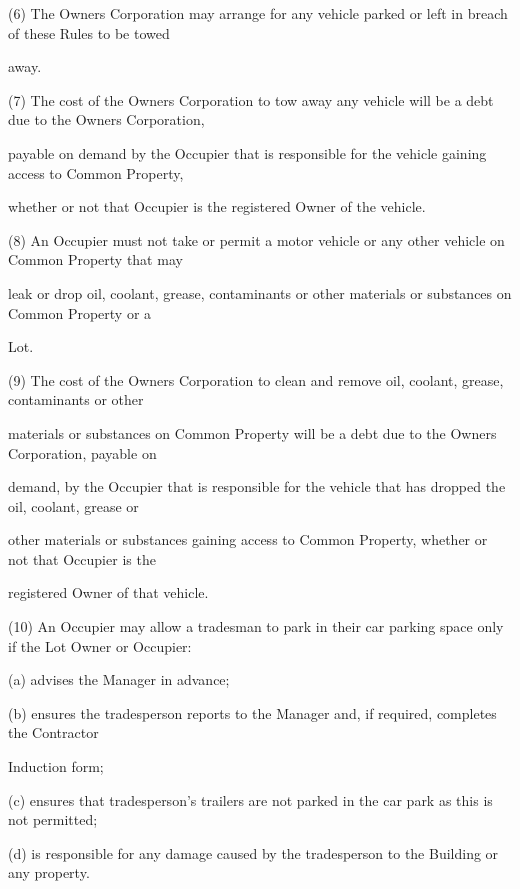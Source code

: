 \documentclass{article}
\begin{document}
{\fontsize{9.962}{1}(6) The Owners Corporation may arrange for any vehicle parked or left in breach of these Rules to be towed }

{\fontsize{10.02}{1}away. }

\newpage

{\fontsize{9.962}{1}(7) The cost of the Owners Corporation to tow away any vehicle will be a debt due to the Owners Corporation, }

{\fontsize{10.02}{1}payable on demand by the Occupier that is responsible for the vehicle gaining access to Common Property, }

{\fontsize{10.02}{1}whether or not that Occupier is the registered Owner of the vehicle. }

{\fontsize{9.962}{1}(8) An Occupier must not take or permit a motor vehicle or any other vehicle on Common Property that may }

{\fontsize{10.02}{1}leak or drop oil, coolant, grease, contaminants or other materials or substances on Common Property or a }

{\fontsize{10.02}{1}Lot. }

{\fontsize{9.962}{1}(9) The cost of the Owners Corporation to clean and remove oil, coolant, grease, contaminants or other }

{\fontsize{10.02}{1}materials or substances on Common Property will be a debt due to the Owners Corporation, payable on }

{\fontsize{10.02}{1}demand, by the Occupier that is responsible for the vehicle that has dropped the oil, coolant, grease or }

{\fontsize{10.02}{1}other materials or substances gaining access to Common Property, whether or not that Occupier is the }

{\fontsize{10.02}{1}registered Owner of that vehicle. }

{\fontsize{9.962}{1}(10) An Occupier may allow a tradesman to park in their car parking space only if the Lot Owner or Occupier: }

{\fontsize{9.962}{1}(a) advises the Manager in advance; }

{\fontsize{9.962}{1}(b) ensures the tradesperson reports to the Manager and, if required, completes the Contractor }

{\fontsize{10.02}{1}Induction form; }

{\fontsize{9.962}{1}(c) ensures that tradesperson’s trailers are not parked in the car park as this is not permitted; }

{\fontsize{9.962}{1}(d) is responsible for any damage caused by the tradesperson to the Building or any property. }
\end{document}
